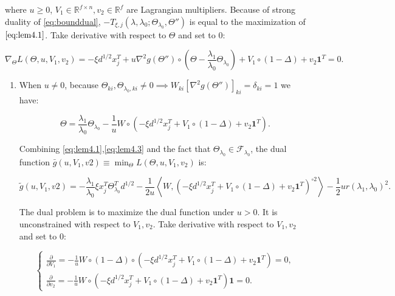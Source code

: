 where $u\geq 0$, $V_1\in\mathbb{R}^{f\times n},v_2\in\mathbb{R}^f$ are Lagrangian multipliers. Because of strong duality of \eqref{eq:bounddual}, $-T_{\xi,j}(\lambda,\lambda_0;\Theta_{\lambda_0},\Theta'')$ is equal to the maximization of $\eqref{eq:lem4.1}$. Take derivative with respect to $\Theta$ and set to 0:

\begin{equation}
    \label{eq:lem4.2}
    \nabla_\Theta L(\Theta,u,V_1,v_2)=-\xi d^{1/2}x_j^T+u\nabla^2g(\Theta'')\circ(\Theta-\frac{\lambda_1}{\lambda_0}\Theta_{\lambda_0})+V_1\circ(1-\Delta)+v_2\mathbf{1}^T=0.
\end{equation}

\begin{enumerate}
    \item When $u\neq 0$, because $\Theta_{ki},\Theta_{\lambda_0,ki}\neq0\implies W_{ki}[\nabla^2g(\Theta'')]_{ki}=\delta_{ki}=1$ we have:

\begin{equation}
    \label{eq:lem4.3}
    \Theta=\frac{\lambda_1}{\lambda_0}\Theta_{\lambda_0}-\frac{1}{u}W\circ\left(-\xi d^{1/2}x_j^T+V_1\circ(1-\Delta)+v_2\mathbf{1}^T\right).
\end{equation}

Combining \eqref{eq:lem4.1},\eqref{eq:lem4.3} and the fact that $\Theta_{\lambda_0}\in\mathcal{F}_{\lambda_0}$, the dual function $\bar{g}(u,V_1,v2)\equiv\min_\Theta L(\Theta,u,V_1,v_2)$ is:

\begin{equation}
    \label{eq:lem4.4}
    \tilde{g}(u,V_1,v2)=-\frac{\lambda_1}{\lambda_0}\xi x_j^T\Theta_{\lambda_0}^Td^{1/2}-\frac{1}{2u}\left\langle W,\left( -\xi d^{1/2} x_j^T+V_1\circ(1-\Delta)+v_2\mathbf{1}^T\right)^{\circ2}\right\rangle-\frac{1}{2}ur(\lambda_1,\lambda_0)^2.
\end{equation}

The dual problem is to maximize the dual function under $u> 0$. It is unconstrained with respect to $V_1,v_2$. Take derivative with respect to $V_1,v_2$ and set to 0:

\begin{equation}
    \label{eq:lem4.5}
    \begin{cases}
    \frac{\partial}{\partial V_1}=-\frac{1}{u}W\circ(1-\Delta)\circ\left(-\xi d^{1/2} x_j^T+V_1\circ(1-\Delta)+v_2\mathbf{1}^T\right)=0,\\
    \frac{\partial}{\partial v_2}=-\frac{1}{u}W\circ\left( -\xi d^{1/2} x_j^T+V_1\circ(1-\Delta)+v_2\mathbf{1}^T\right)\mathbf{1}=0.
    \end{cases}
\end{equation}


\end{enumerate}

